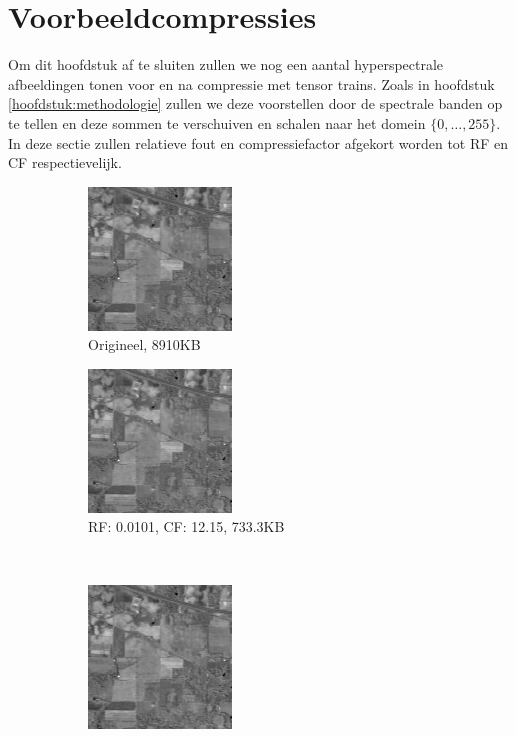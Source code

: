 \section{Voorbeeldcompressies}

Om dit hoofdstuk af te sluiten zullen we nog een aantal hyperspectrale afbeeldingen tonen voor en na compressie met tensor trains. Zoals in hoofdstuk \ref{hoofdstuk:methodologie} zullen we deze voorstellen door de spectrale banden op te tellen en deze sommen te verschuiven en schalen naar het domein $\{0, \dots, 255\}$. In deze sectie zullen relatieve fout en compressiefactor afgekort worden tot RF en CF respectievelijk.

\begin{figure}[H]
\centering
\begin{subfigure}{0.48\textwidth}
  \centering
  \includegraphics[scale=1]{images/indian_pines_cropped_sum.png}
  \caption{Origineel, 8910KB}
\end{subfigure}
\begin{subfigure}{0.48\textwidth}
  \centering
  \includegraphics[scale=1]{images/example_compression_Indian_Pines_0_01.png}
  \caption{RF: 0.0101, CF: 12.15, 733.3KB}
\end{subfigure}
\\
\begin{subfigure}{0.48\textwidth}
  \centering
  \includegraphics[scale=1]{images/example_compression_Indian_Pines_0_025.png}

\end{subfigure}
\end{figure}

